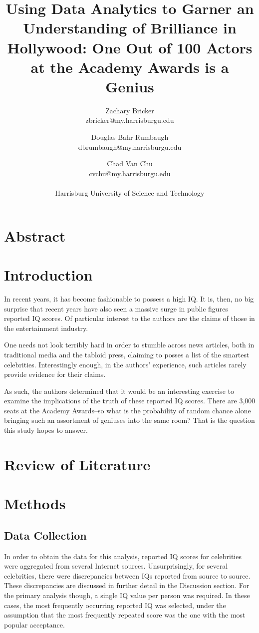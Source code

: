 \documentclass[12pt,letterpaper,titlepage,oneside]{article}
\title{Using Data Analytics to Garner an Understanding of Brilliance in Hollywood: One Out of 100 Actors at the Academy Awards is a Genius}
\author{
	Zachary Bricker  \\
	zbricker@my.harrisburgu.edu
	\and
	Douglas Bahr Rumbaugh \\
	dbrumbaugh@my.harrisburgu.edu
	\and 
	Chad Van Chu \\
	cvchu@my.harrisburgu.edu
	\\
	\\
	Harrisburg University of Science and Technology
}
\date{}
\begin{document}
\maketitle
\section*{Abstract}
\tableofcontents
\pagebreak


\section{Introduction}
In recent years, it has become fashionable to possess a high IQ. It is, then, no big surprise that recent years have also seen a massive surge in public figures reported IQ scores. Of particular interest to the authors are the claims of those in the entertainment industry.

One needs not look terribly hard in order to stumble across news articles, both in traditional media and the tabloid press, claiming to posses a list of the smartest celebrities. Interestingly enough, in the authors' experience, such articles rarely provide evidence for their claims.

As such, the authors determined that it would be an interesting exercise to examine the implications of the truth of these reported IQ scores. There are 3,000 seats at the Academy Awards--so what is the probability of random chance alone bringing such an assortment of geniuses into the same room? That is the question this study hopes to answer.
\section{Review of Literature}

\section{Methods}

\subsection{Data Collection}
\label{methoddata}
In order to obtain the data for this analysis, reported IQ scores for celebrities were aggregated from several Internet sources. Unsurprisingly, for several celebrities, there were discrepancies between IQs reported from source to source. These discrepancies are discussed in further detail in the Discussion section. For the primary analysis though, a single IQ value per person was required. In these cases, the most frequently occurring reported IQ was selected, under the assumption that the most frequently repeated score was the one with the most popular acceptance.
\end{document}
